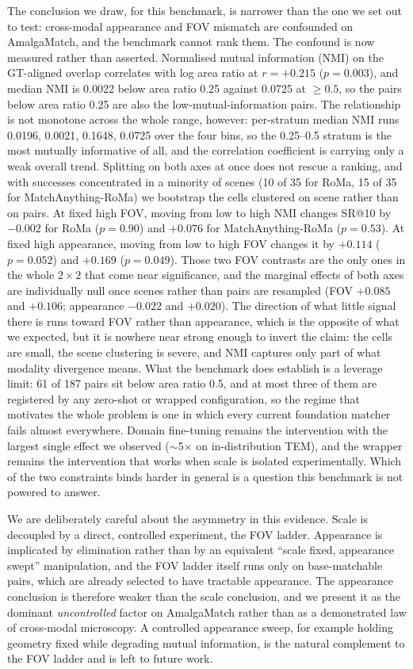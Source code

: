 \documentclass[fleqn,10pt]{wlscirep}
\begin{document}
The conclusion we draw, for this benchmark, is narrower than the one we set out to test: cross-modal appearance and FOV mismatch are confounded on AmalgaMatch, and the benchmark cannot rank them. The confound is now measured rather than asserted. Normalised mutual information (NMI) on the GT-aligned overlap correlates with log area ratio at $r=+0.215$ ($p=0.003$), and median NMI is 0.0022 below area ratio 0.25 against 0.0725 at $\ge0.5$, so the pairs below area ratio 0.25 are also the low-mutual-information pairs. The relationship is not monotone across the whole range, however: per-stratum median NMI runs 0.0196, 0.0021, 0.1648, 0.0725 over the four bins, so the 0.25--0.5 stratum is the most mutually informative of all, and the correlation coefficient is carrying only a weak overall trend. Splitting on both axes at once does not rescue a ranking, and with successes concentrated in a minority of scenes (10 of 35 for RoMa, 15 of 35 for MatchAnything-RoMa) we bootstrap the cells clustered on scene rather than on pairs. At fixed high FOV, moving from low to high NMI changes SR@10 by $-0.002$ for RoMa ($p=0.90$) and $+0.076$ for MatchAnything-RoMa ($p=0.53$). At fixed high appearance, moving from low to high FOV changes it by $+0.114$ ($p=0.052$) and $+0.169$ ($p=0.049$). Those two FOV contrasts are the only ones in the whole $2\times2$ that come near significance, and the marginal effects of both axes are individually null once scenes rather than pairs are resampled (FOV $+0.085$ and $+0.106$; appearance $-0.022$ and $+0.020$). The direction of what little signal there is runs toward FOV rather than appearance, which is the opposite of what we expected, but it is nowhere near strong enough to invert the claim: the cells are small, the scene clustering is severe, and NMI captures only part of what modality divergence means. What the benchmark does establish is a leverage limit: 61 of 187 pairs sit below area ratio 0.5, and at most three of them are registered by any zero-shot or wrapped configuration, so the regime that motivates the whole problem is one in which every current foundation matcher fails almost everywhere. Domain fine-tuning remains the intervention with the largest single effect we observed ($\sim$5$\times$ on in-distribution TEM), and the wrapper remains the intervention that works when scale is isolated experimentally. Which of the two constraints binds harder in general is a question this benchmark is not powered to answer.

We are deliberately careful about the asymmetry in this evidence. Scale is decoupled by a direct, controlled experiment, the FOV ladder. Appearance is implicated by elimination rather than by an equivalent ``scale fixed, appearance swept'' manipulation, and the FOV ladder itself runs only on base-matchable pairs, which are already selected to have tractable appearance. The appearance conclusion is therefore weaker than the scale conclusion, and we present it as the dominant \emph{uncontrolled} factor on AmalgaMatch rather than as a demonstrated law of cross-modal microscopy. A controlled appearance sweep, for example holding geometry fixed while degrading mutual information, is the natural complement to the FOV ladder and is left to future work.
\end{document}
